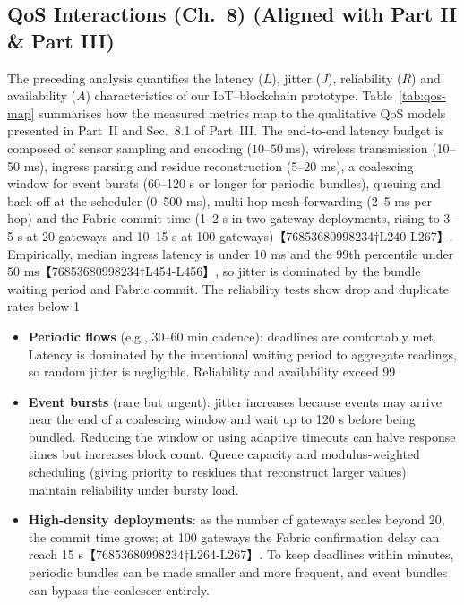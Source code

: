 \documentclass[12pt,onecolumn]{IEEEtran} %
\begin{document}
\subsection{QoS Interactions (Ch.~8) (Aligned with Part II \& Part III)}
\label{subsec:qos-interactions}

The preceding analysis quantifies the latency (\(L\)), jitter (\(J\)), reliability (\(R\)) and availability (\(A\)) characteristics of our IoT–blockchain prototype.  Table~\ref{tab:qos-map} summarises how the measured metrics map to the qualitative QoS models presented in Part~II and Sec.~8.1 of Part~III.  The end‑to‑end latency budget is composed of sensor sampling and encoding (\(10\)–\(50\,\text{ms}\)), wireless transmission (10–50 ms), ingress parsing and residue reconstruction (5–20 ms), a coalescing window for event bursts (60–120 s or longer for periodic bundles), queuing and back‑off at the scheduler (0–500 ms), multi‑hop mesh forwarding (2–5 ms per hop) and the Fabric commit time (1–2 s in two‑gateway deployments, rising to 3–5 s at 20 gateways and 10–15 s at 100 gateways)【76853680998234†L240-L267】.  Empirically, median ingress latency is under 10 ms and the \(99\)th percentile under 50 ms【76853680998234†L454-L456】, so jitter is dominated by the bundle waiting period and Fabric commit.  The reliability tests show drop and duplicate rates below 1 %
\begin{itemize}
  \item \textbf{Periodic flows} (e.g., 30–60 min cadence): deadlines are comfortably met.  Latency is dominated by the intentional waiting period to aggregate readings, so random jitter is negligible.  Reliability and availability exceed 99 %
  \item \textbf{Event bursts} (rare but urgent): jitter increases because events may arrive near the end of a coalescing window and wait up to 120 s before being bundled.  Reducing the window or using adaptive timeouts can halve response times but increases block count.  Queue capacity and modulus‑weighted scheduling (giving priority to residues that reconstruct larger values) maintain reliability under bursty load.
  \item \textbf{High‑density deployments}: as the number of gateways scales beyond 20, the commit time grows; at 100 gateways the Fabric confirmation delay can reach 15 s【76853680998234†L264-L267】.  To keep deadlines within minutes, periodic bundles can be made smaller and more frequent, and event bundles can bypass the coalescer entirely.
\end{itemize}
\end{document}
